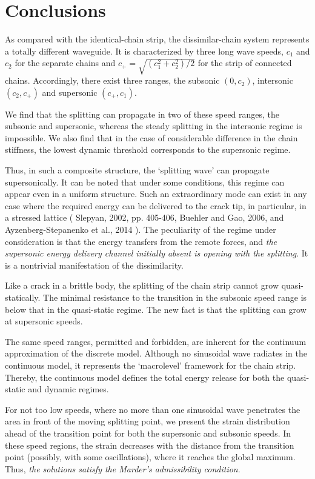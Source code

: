 \documentclass[12pt]{article}
\begin{document}
\section{Conclusions}
As compared with the identical-chain strip, the dissimilar-chain system represents a totally different waveguide. It is characterized by three long wave speeds, $c_1$ and $c_2$ for the separate chains and $c_+=\sqrt{(c_1^2+c_2^2)/2}$  for the strip of connected chains.  Accordingly, there exist three ranges, the subsonic $(0, c_2)$, intersonic $(c_2, c_+)$  and supersonic $(c_+,c_1)$.

We find that the splitting can propagate in two of these speed ranges, the subsonic and supersonic, whereas the steady splitting in the intersonic regime is impossible. We also find that in the case of considerable difference in the chain stiffness, the lowest dynamic threshold corresponds to the supersonic regime.

Thus, in such a composite structure, the `splitting wave' can propagate supersonically. It can be noted that under some conditions, this regime can appear even in a uniform structure. Such an extraordinary mode can exist in any case where the required energy can be delivered to the crack tip, in particular, in a stressed lattice ( Slepyan, 2002, pp. 405-406, Buehler and Gao, 2006,  and Ayzenberg-Stepanenko et al., 2014 ). The peculiarity of the regime under consideration is that the energy transfers from the remote forces, and {\em the supersonic energy delivery channel initially absent is opening with the splitting}. It is a nontrivial manifestation of the dissimilarity.

Like a crack in a brittle body, the splitting of the chain strip cannot grow quasi-statically. The minimal resistance to the transition in the subsonic speed range is below that in the quasi-static regime. The new fact is that the splitting can grow at supersonic speeds.

The same speed ranges, permitted and forbidden, are inherent for the continuum approximation of the discrete model. Although no sinusoidal wave radiates in the continuous model, it represents the `macrolevel' framework for the chain strip. Thereby, the continuous model defines the total energy release for both the quasi-static and dynamic regimes.

For not too low speeds, where no more than one sinusoidal wave penetrates the area in front of the moving splitting point, we present the strain distribution ahead of the transition point for both the supersonic and subsonic speeds.  In these speed regions, the strain decreases with the distance from the transition point (possibly, with some oscillations), where it reaches the global maximum. Thus, {\em  the solutions satisfy the Marder's admissibility condition}.
\end{document}
